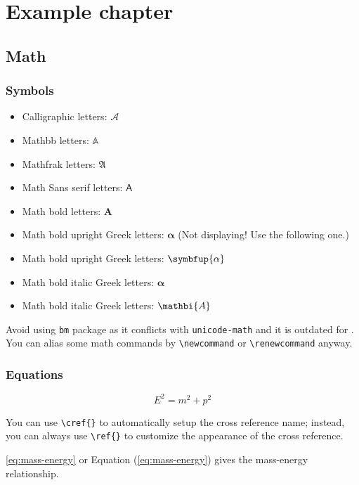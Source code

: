 \chapter{Example chapter}\label{chap:sample}

\section{Math}

\subsection{Symbols}

\begin{itemize}
  \item Calligraphic letters: $\mathcal{A}$ 
  \item Mathbb letters: $\mathbb{A}$
  \item Mathfrak letters: $\mathfrak{A}$
  \item Math Sans serif letters: $\mathsf{A}$
  \item Math bold letters: $\mathbf{A}$
  \item Math bold upright Greek letters: $\mathbf{\alpha}$ (Not displaying! Use the following one.)
  \item Math bold upright Greek letters: $\symbfup{\alpha}$
  \item Math bold italic Greek letters: $\bm{\alpha}$
  \item Math bold italic Greek letters: $\mathbi{A}$
\end{itemize}

Avoid using \lstinline|bm| package as it conflicts with \lstinline|unicode-math| and it is outdated for .
You can alias some math commands by \lstinline|\newcommand| or \lstinline|\renewcommand| anyway.

\subsection{Equations}

\begin{equation}
  E^2 = m^2 + p^2\label{eq:mass-energy}
\end{equation}

You can use \lstinline|\cref{}| to automatically setup the cross reference name; instead, you can always use \lstinline|\ref{}| to customize the appearance of the cross reference.

\cref{eq:mass-energy} or Equation (\ref{eq:mass-energy}) gives the mass-energy relationship.

